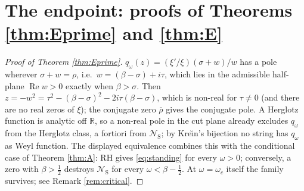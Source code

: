 \documentclass[11pt,reqno]{amsart}
\theoremstyle{plain}
\theoremstyle{definition}
\newcommand{\R}{\mathbb{R}}
\newcommand{\Rp}{\operatorname{Re}}
\newcommand{\NS}{\mathcal N_{\mathrm S}}
\begin{document}
\section{The endpoint: proofs of Theorems \ref{thm:Eprime} and \ref{thm:E}}\label{sec:thmE}

\begin{proof}[Proof of Theorem \ref{thm:Eprime}]
$q_\omega(z)=(\xi'/\xi)(\sigma+w)/w$ has a pole wherever $\sigma+w=\rho$, i.e.\
$w=(\beta-\sigma)+i\tau$, which lies in the admissible half-plane $\Rp w>0$ exactly when
$\beta>\sigma$. Then $z=-w^2=\tau^2-(\beta-\sigma)^2-2i\tau(\beta-\sigma)$, which is non-real
for $\tau\neq0$ (and there are no real zeros of $\xi$); the conjugate zero
$\overline\rho$ gives the conjugate pole. A Herglotz function is analytic off $\R$, so a
non-real pole in the cut plane already excludes $q_\omega$ from the Herglotz class, a fortiori
from $\NS$; by Kre\u\i n's bijection no string has $q_\omega$ as Weyl function. The displayed
equivalence combines this with the conditional case of Theorem \ref{thm:A}: RH gives
\eqref{eq:standing} for every $\omega>0$; conversely, a zero with $\beta>\tfrac12$ destroys
$\NS$ for every $\omega<\beta-\tfrac12$. At $\omega=\omega_c$ itself the family survives; see
Remark \ref{rem:critical}.
\end{proof}
\end{document}
